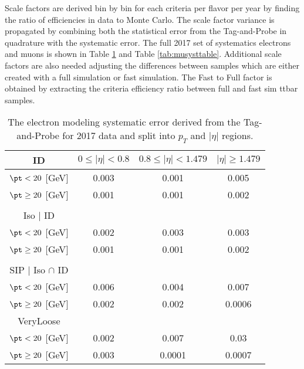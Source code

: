 Scale factors are derived bin by bin for each criteria per flavor per year by finding the ratio of efficiencies in data to Monte Carlo. The scale factor variance is propagated by combining both the statistical error from the Tag-and-Probe in quadrature with the systematic error. The full 2017 set of systematics electrons and muons is shown in Table \ref{tab:elesysts} and Table \ref{tab:musysttable}. Additional scale factors are also  needed adjusting the differences between samples which are either created with a full simulation or fast simulation. The Fast to Full factor is obtained by extracting the criteria efficiency ratio between  full and fast sim ttbar samples.

	
\begin{table}
\centering
\caption{The electron modeling systematic error derived from the Tag-and-Probe for 2017 data and split into $p_T$ and $|\eta|$ regions. }
\label{tab:elesysts}
\begin{tabular}{|c|ccc|}
\hline
ID & $0\leq |\eta|<0.8$ & $0.8\leq |\eta|<1.479$ & $|\eta|\geq1.479$ \\
\hline
$\pt < 20$ [GeV] & 0.003 & 0.001 & 0.005 \\
$\pt \geq 20$ [GeV] & 0.001 & 0.001 & 0.002  \\
 &  &  &    \\
\hline
Iso $|$ ID  &  &  &   \\
\hline
$\pt < 20$ [GeV] & 0.002 & 0.003 & 0.003   \\
$\pt \geq 20$ [GeV] & 0.001 & 0.001 & 0.002 \\
 &  &  &   \\
\hline
SIP $|$ Iso $\cap$ ID &  &  &  \\
\hline
$\pt < 20$ [GeV]& 0.006 & 0.004 & 0.007 \\
$\pt \geq 20$ [GeV]& 0.002 & 0.002 & 0.0006  \\
\hline
VeryLoose &  &  &  \\
\hline
$\pt < 20$ [GeV]& 0.002 & 0.007 & 0.03 \\
$\pt \geq 20$ [GeV]& 0.003 & 0.0001 & 0.0007 \\
\hline
\end{tabular}
\end{table}


